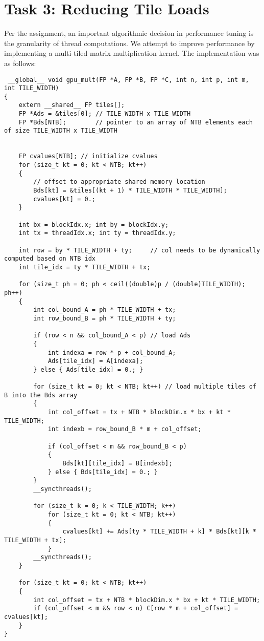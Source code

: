 \documentclass{article}
\begin{document}
\section{Task 3: Reducing Tile Loads}
Per the assignment, an important algorithmic decision in performance tuning 
is the granularity of thread computations. We attempt to improve performance 
by implementing a multi-tiled matrix multiplication kernel. The implementation was 
as follows:
\begin{lstlisting}
 __global__ void gpu_mult(FP *A, FP *B, FP *C, int n, int p, int m, int TILE_WIDTH)
{
    extern __shared__ FP tiles[];
    FP *Ads = &tiles[0]; // TILE_WIDTH x TILE_WIDTH
    FP *Bds[NTB];        // pointer to an array of NTB elements each of size TILE_WIDTH x TILE_WIDTH

    
    FP cvalues[NTB]; // initialize cvalues
    for (size_t kt = 0; kt < NTB; kt++)
    {
        // offset to appropriate shared memory location
        Bds[kt] = &tiles[(kt + 1) * TILE_WIDTH * TILE_WIDTH]; 
        cvalues[kt] = 0.;
    }

    int bx = blockIdx.x; int by = blockIdx.y;
    int tx = threadIdx.x; int ty = threadIdx.y;

    int row = by * TILE_WIDTH + ty;     // col needs to be dynamically computed based on NTB idx
    int tile_idx = ty * TILE_WIDTH + tx;

    for (size_t ph = 0; ph < ceil((double)p / (double)TILE_WIDTH); ph++)
    {
        int col_bound_A = ph * TILE_WIDTH + tx;
        int row_bound_B = ph * TILE_WIDTH + ty;

        if (row < n && col_bound_A < p) // load Ads
        {
            int indexa = row * p + col_bound_A;
            Ads[tile_idx] = A[indexa];
        } else { Ads[tile_idx] = 0.; }

        for (size_t kt = 0; kt < NTB; kt++) // load multiple tiles of B into the Bds array
        {
            int col_offset = tx + NTB * blockDim.x * bx + kt * TILE_WIDTH;
            int indexb = row_bound_B * m + col_offset;

            if (col_offset < m && row_bound_B < p)
            {
                Bds[kt][tile_idx] = B[indexb];
            } else { Bds[tile_idx] = 0.; }
        }
        __syncthreads();

        for (size_t k = 0; k < TILE_WIDTH; k++)
            for (size_t kt = 0; kt < NTB; kt++)
            {
                cvalues[kt] += Ads[ty * TILE_WIDTH + k] * Bds[kt][k * TILE_WIDTH + tx];
            }
        __syncthreads();
    }

    for (size_t kt = 0; kt < NTB; kt++)
    {
        int col_offset = tx + NTB * blockDim.x * bx + kt * TILE_WIDTH;
        if (col_offset < m && row < n) C[row * m + col_offset] = cvalues[kt];
    }
}
\end{lstlisting}
\end{document}
